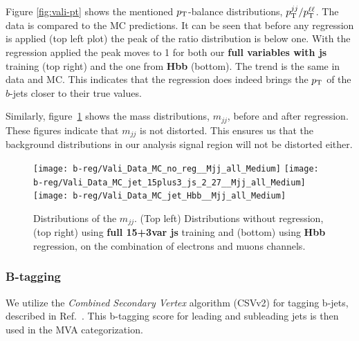 Figure \ref{fig:vali-pt} shows the mentioned $p_{\mathrm{T}}$-balance
distributions, $p_{\mathrm{T}}^{jj}/p_{\mathrm{T}}^{\ell\ell}$.  The data is compared to the
MC predictions. It can be seen that before any regression is applied (top left plot) the peak of the ratio distribution is below one. 
With the regression applied the peak moves to 1 for both our \textbf{full variables with js}
 training (top right) and the one from \textbf{Hbb} (bottom). The
trend is the same in data and MC.  This indicates that the regression
does indeed brings the $p_{\mathrm{T}}$ of the $b$-jets closer to their true
values.

Similarly, figure~\ref{fig:vali-Mjj} shows the mass distributions,
$m_{jj}$, before and after regression. These figures indicate that
$m_{jj}$ is not distorted. This ensures us that the background distributions in our
analysis signal region will not be distorted either.


\begin{figure}[thb]
  \centering
  \texttt{[image: b-reg/Vali\_Data\_MC\_no\_reg\_\_Mjj\_all\_Medium]}\hfil
  \texttt{[image: b-reg/Vali\_Data\_MC\_jet\_15plus3\_js\_2\_27\_\_Mjj\_all\_Medium]}\hfil
  \texttt{[image: b-reg/Vali\_Data\_MC\_jet\_Hbb\_\_Mjj\_all\_Medium]}\hfil\\
  \caption{Distributions of the $m_{jj}$. (Top left) Distributions without regression, (top right) using
    \textbf{full 15+3var js} training and (bottom) using
    \textbf{Hbb} regression, on the combination of electrons and muons channels.}
  \label{fig:vali-Mjj}
\end{figure}

\clearpage

\subsubsection{B-tagging}
\label{sec:btag}

We utilize the \textit{Combined Secondary Vertex} algorithm (CSVv2) for tagging b-jets,
described in Ref.~\cite{btag-twiki}. This b-tagging score for leading and subleading jets is then used in the MVA categorization.

